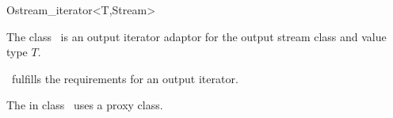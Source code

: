 \begin{ccRefClass}{Ostream_iterator<T,Stream>}

\ccDefinition

The class \ccRefName\ is an output iterator adaptor for the
output stream class  and value type $T$.


\ccCreation
{}


\ccOperations

\ccVar\ fulfills the requirements for an output iterator.

\ccImplementation

The  in class \ccRefName\ uses a proxy class. 

\end{ccRefClass}
